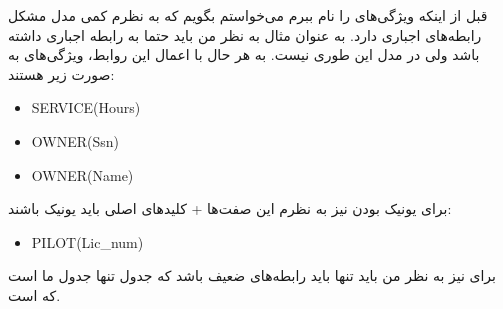 \noindent
قبل از اینکه ویژگی‌های
را نام ببرم می‌خواستم بگویم که به نظرم کمی مدل
مشکل رابطه‌های اجباری دارد. به عنوان مثال به نظر من باید حتما
به
رابطه اجباری داشته باشد ولی در مدل
این طوری نیست. به هر حال با اعمال این روابط، ویژگی‌های
به صورت زیر هستند:
\begin{latin}
\begin{itemize}
    \item SERVICE(Hours)
    \item OWNER(Ssn)
    \item OWNER(Name)
\end{itemize}
\end{latin}
برای یونیک بودن نیز به نظرم این صفت‌ها + کلید‌های اصلی باید یونیک باشند:
\begin{latin}
\begin{itemize}
    \item PILOT(Lic\_num)
\end{itemize}
\end{latin}
برای
نیز به نظر من باید تنها باید رابطه‌های ضعیف باشد که جدول
تنها جدول ما است که
است. 
